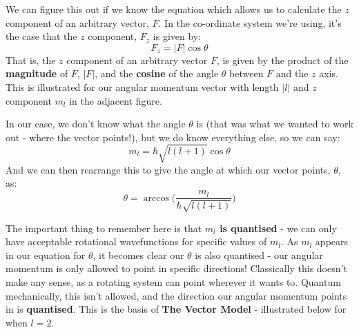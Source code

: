 \documentclass{memoir}[11pt,oneside,a4paper,openany]
\begin{document}
We can figure this out if we know the equation which allows us to calculate the $z$ component of an arbitrary vector, $F$. In the co-ordinate system we're using, it's the case that the $z$ component, $F_z$ is given by:
\begin{equation}
	F_z = \lvert F \rvert \cos\theta
\end{equation}
That is, the $z$ component of an arbitrary vector $F$, is given by the product of the \textbf{magnitude} of $F$, $\lvert F \rvert$, and the \textbf{cosine} of the angle $\theta$ between $F$ and the $z$ axis. This is illustrated for our angular momentum vector with length $\lvert l \rvert$ and $z$ component $m_l$ in the adjacent figure.

In our case, we don't know what the angle $\theta$ is (that was what we wanted to work out - where the vector points!), but we do know everything else, so we can say:
\begin{equation}
	m_l = \hbar\sqrt{l(l+1)} \cos\theta
\end{equation}
And we can then rearrange this to give the angle at which our vector points, $\theta$, as:
\begin{equation}
	\theta = \arccos \bigg(\frac{m_l}{\hbar\sqrt{l(l+1)}}\bigg)
\end{equation}

The important thing to remember here is that \textbf{$m_l$ is quantised} - we can only have acceptable rotational wavefunctions for specific values of $m_l$. As $m_l$ appears in our equation for $\theta$, it becomes clear our $\theta$ is also quantised - our angular momentum is only allowed to point in specific directions! Classically this doesn't make any sense, as a rotating system can point wherever it wants to. Quantum mechanically, this isn't allowed, and the direction our angular momentum points in is \textbf{quantised}. This is the basis of \textbf{The Vector Model} - illustrated below for when $l=2$.
\end{document}
